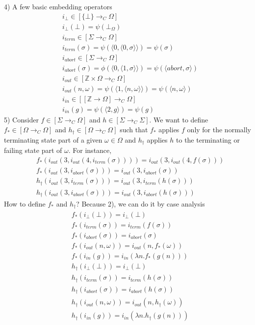 \documentclass{report}[12pt]
\begin{document}
4) A few basic embedding operators
\begin{align*}
  &i_\bot \in [\{\bot\} \rightarrow_C \Omega] \\
  &i_\bot (\bot) = \psi(\bot_\Omega) \\
  &i_{term} \in [\Sigma \rightarrow_C \Omega] \\
  &i_{term} (\sigma) = \psi(\langle 0, \langle 0, \sigma \rangle \rangle) = \psi(\sigma) \\
  &i_{abort} \in [\Sigma \rightarrow_C \Omega] \\
  &i_{abort} (\sigma) = \phi (\langle 0, \langle 1, \sigma \rangle \rangle) = \psi(\langle abort, \sigma \rangle) \\
  &i_{out} \in [\mathbb{Z} \times \Omega \rightarrow_C \Omega] \\
  &i_{out} (n, \omega) = \psi(\langle 1, \langle n, \omega \rangle \rangle) = \psi(\langle n, \omega \rangle) \\
  &i_{in} \in [[\mathbb{Z} \rightarrow \Omega] \rightarrow_C \Omega] \\
  &i_{in} (g) = \psi(\langle 2, g \rangle) = \psi(g)
\end{align*}
5) Consider $f \in [\Sigma \rightarrow_C \Omega]$ and $h\in [\Sigma \rightarrow_C \Sigma]$. We want to define $f_* \in [\Omega \rightarrow_C \Omega]$ and $h_\dagger \in [\Omega \rightarrow_C \Omega]$ such that $f_*$ applies $f$
only for the normally terminating state part of a given $\omega \in \Omega$ and $h_\dagger$ applies $h$ to the terminating or failing state part of $\omega$. For instance,
\begin{align*}
  &f_* (i_{out} (3, i_{out} (4, i_{term} (\sigma)))) = i_{out} (3, i_{out} (4, f(\sigma))) \\
  &f_* (i_{out} (3, i_{abort} (\sigma))) = i_{out}(3, i_{abort} (\sigma)) \\
  &h_\dagger (i_{out} (3, i_{term} (\sigma))) = i_{out} (3, i_{term} (h(\sigma))) \\
  &h_\dagger (i_{out} (3, i_{abort} (\sigma))) = i_{out} (3, i_{abort} (h(\sigma)))
\end{align*}
How to define $f_*$ and $h_\dagger$? Because 2), we can do it by case analysis
\begin{align*}
  &f_* (i_\bot (\bot)) = i_\bot (\bot) \\
  &f_* (i_{term} (\sigma)) = i_{term} (f(\sigma)) \\
  &f_* (i_{abort} (\sigma)) = i_{abort} (\sigma) \\
  &f_* (i_{out} (n, \omega)) = i_{out} (n, f_* (\omega)) \\
  &f_* (i_{in} (g)) = i_{in} (\lambda n. f_* (g(n))) \\
  &h_\dagger (i_{\bot} (\bot)) = i_\bot (\bot) \\
  &h_\dagger (i_{term} (\sigma)) = i_{term} (h(\sigma)) \\
  &h_\dagger (i_{abort} (\sigma)) = i_{abort} (h(\sigma)) \\
  &h_\dagger (i_{out} (n, \omega)) = i_{out} (n, h_\dagger (\omega)) \\
  &h_\dagger (i_{in} (g)) = i_{in} (\lambda n. h_\dagger (g(n)))
\end{align*}
\end{document}
